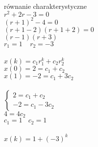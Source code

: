 \\
równanie charakterystyczne\\
$r^2+2r-3=0$\\
$(r+1)^2-4=0$\\
$(r+1-2)(r+1+2)=0$\\
$(r-1)(r+3)$\\
$r_1=1\ \ \ \ \ r_2=-3$\\
\\
$x(k)=c_1r_1^k+c_2r_2^k$\\
$x(0)=2=c_1+c_2$\\
$x(1)=-2=c_1+3c_2$\\
\\
$\begin{cases}2=c_1+c_2\\-2=c_1-3c_2 \end{cases}$\\
$4=4c_2$\\
$c_1=1\ \ \ \ c_2=1$\\
\\
$\boxed{x(k)=1+(-3)^k}$










\pagebreak
